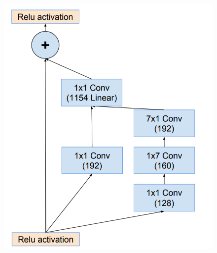 \begin{figure}[htbp]
{\begin{minipage}{0.30\linewidth}
			\includegraphics[width = \linewidth]{readings_figures/Inception_ResNet_v2_17grid.png}
			\label{fig:Inception_ResNet_v2_17grid}
		\end{minipage}
	}
	\\
	\centering
\end{figure}
